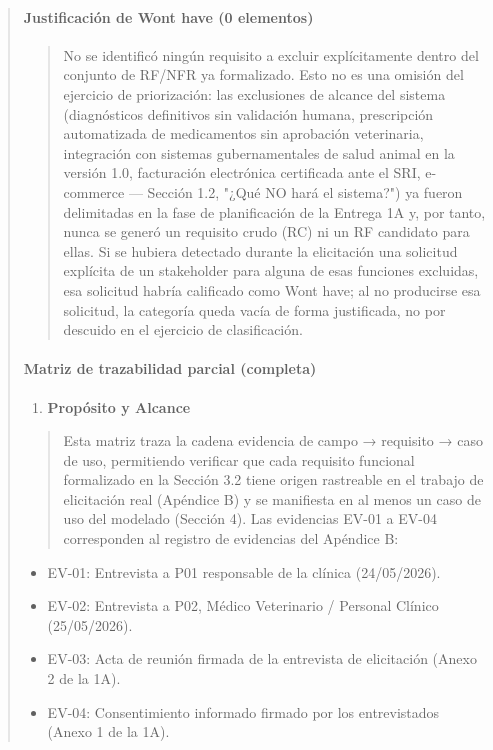 \documentclass[
]{article}
\begin{document}
\begin{quote}
\paragraph{Justificación de Won\textquotesingle t have (0
elementos)}\label{justificaciuxf3n-de-wont-have-0-elementos}

\begin{quote}
No se identificó ningún requisito a excluir explícitamente dentro del
conjunto de RF/NFR ya formalizado. Esto no es una omisión del ejercicio
de priorización: las exclusiones de alcance del sistema (diagnósticos
definitivos sin validación humana, prescripción automatizada de
medicamentos sin aprobación veterinaria, integración con sistemas
gubernamentales de salud animal en la versión 1.0, facturación
electrónica certificada ante el SRI, e-commerce --- Sección 1.2, "¿Qué
NO hará el sistema?") ya fueron delimitadas en la fase de planificación
de la Entrega 1A y, por tanto, nunca se generó un requisito crudo (RC)
ni un RF candidato para ellas. Si se hubiera detectado durante la
elicitación una solicitud explícita de un stakeholder para alguna de
esas funciones excluidas, esa solicitud habría calificado como
Won\textquotesingle t have; al no producirse esa solicitud, la categoría
queda vacía de forma justificada, no por descuido en el ejercicio de
clasificación.
\end{quote}

\paragraph{Matriz de trazabilidad parcial
(completa)}\label{matriz-de-trazabilidad-parcial-completa}

\begin{enumerate}
\def\labelenumi{\arabic{enumi}.}
\item
  \protect{}\label{_bookmark111}{}\textbf{Propósito y
  Alcance}
\end{enumerate}

\begin{quote}
Esta matriz traza la cadena evidencia de campo → requisito → caso de
uso, permitiendo verificar que cada requisito funcional formalizado en
la Sección 3.2 tiene origen rastreable en el trabajo de elicitación real
(Apéndice B) y se manifiesta en al menos un caso de uso del modelado
(Sección 4). Las evidencias EV-01 a EV-04 corresponden al registro de
evidencias del Apéndice B:
\end{quote}

\begin{itemize}
\item
  EV-01: Entrevista a P01 responsable de la clínica (24/05/2026).
\item
  EV-02: Entrevista a P02, Médico Veterinario / Personal Clínico
  (25/05/2026).
\item
  EV-03: Acta de reunión firmada de la entrevista de elicitación (Anexo
  2 de la 1A).
\item
  EV-04: Consentimiento informado firmado por los entrevistados (Anexo 1
  de la 1A).
\end{itemize}


\end{quote}
\end{document}
